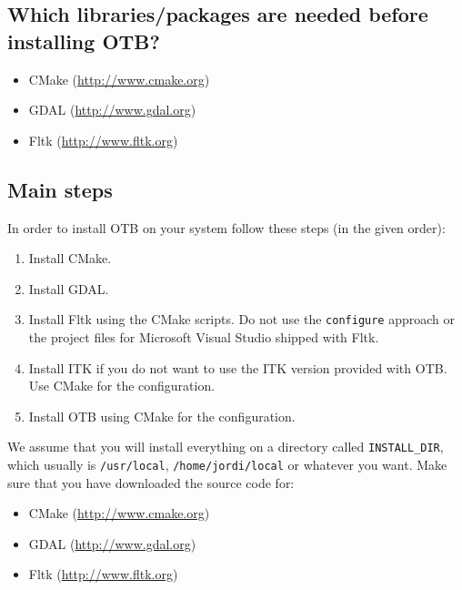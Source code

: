 \subsection{Which libraries/packages are needed before installing
 OTB?}
\begin{itemize}
\item CMake (\url{http://www.cmake.org})
\item GDAL (\url{http://www.gdal.org})
\item Fltk (\url{http://www.fltk.org})
\end{itemize}
       
\subsection{Main steps}
In order to install OTB on your system follow these steps (in the
given order):
\begin{enumerate}
  \item Install CMake.
  \item Install GDAL.
  \item Install Fltk using the CMake scripts. Do not use the
  \texttt{configure} approach or the project files for Microsoft
  Visual Studio shipped with Fltk.
  \item Install ITK if you do not want to use the ITK version provided
  with OTB. Use CMake for the configuration.
  \item Install OTB using CMake for the configuration.
\end{enumerate}

We assume that you will install everything on a directory called
\texttt{INSTALL\_DIR}, which usually is \texttt{/usr/local}, \texttt{/home/jordi/local} or
whatever you want. Make sure that you have downloaded the source code for:
  \begin{itemize}
  \item CMake (\url{http://www.cmake.org})
  \item GDAL (\url{http://www.gdal.org})
  \item Fltk (\url{http://www.fltk.org})
  \end{itemize}

